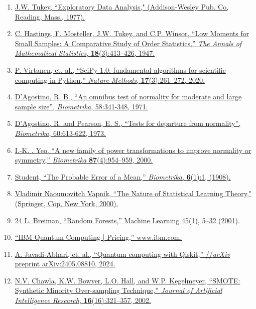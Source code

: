 \documentclass[11pt, oneside]{article}   	%
\begin{document}
\begin{enumerate}
   \item \href{https://books.google.com/books/about/Exploratory_Data_Analysis.html?id=UT9dAAAAIAAJ}{J.W. Tukey, ``Exploratory Data Analysis," (Addison-Wesley Pub. Co, Reading, Mass., 1977).}
   
   \item \href{https://doi.org/10.1214/aoms/1177730388}{C. Hastings, F. Mosteller, J.W. Tukey, and C.P. Winsor, ``Low Moments for Small Samples: A Comparative Study of Order Statistics,” \textit{The Annals of Mathematical Statistics}, \textbf{18}(3):413–426, 1947.}
   
   \item \href{https://www.nature.com/articles/s41592-019-0686-2}{P. Virtanen, et. al., “SciPy 1.0: fundamental algorithms for scientific computing in Python,” \textit{Nature Methods}, \textbf{17}(3):261–272, 2020.}
   
   \item \href{https://doi.org/10.2307/2334522}{D’Agostino, R. B., ``An omnibus test of normality for moderate and large sample size”, \textit{Biometrika}, 58:341-348, 1971.}
   
   \item \href{https://doi.org/10.2307/2335012}{D’Agostino, R. and Pearson, E. S., ``Tests for departure from normality”, \textit{Biometrika}, 60:613-622, 1973.}
   
   \item \href{https://doi.org/10.1093/biomet/87.4.954}{I.-K. . Yeo, “A new family of power transformations to improve normality or symmetry,” \textit{Biometrika} \textbf{87}(4):954–959, 2000.}
   
   \item \href{https://doi.org/10.2307/2331554}{Student, “The Probable Error of a Mean,” \textit{Biometrika}, \textbf{6}(1):1, (1908).}
   
   \item \href{https://link.springer.com/book/10.1007/978-1-4757-3264-1}{Vladimir Naoumovitch Vapnik, ``The Nature of Statistical Learning Theory," (Springer, Cop, New York, 2000).}
   
   \item \href{https://doi.org/10.1023/A:1010933404324}{24 L. Breiman, ``Random Forests,” Machine Learning 45(1), 5–32 (2001).}
   
   \item \href{https://www.ibm.com/quantum/pricing}{``IBM Quantum Computing | Pricing,” www.ibm.com.}
   
   \item \href{https://doi.org/10.48550/arXiv.2405.08810}{A. Javadi-Abhari, et. al., ``Quantum computing with Qiskit,” //\textit{arXiv} preprint arXiv:2405.08810, 2024.}
   
   \item \href{https://doi.org/10.1613/jair.953}{N.V. Chawla, K.W. Bowyer, L.O. Hall, and W.P. Kegelmeyer, ``SMOTE: Synthetic Minority Over-sampling Technique,” \textit{Journal of Artificial Intelligence Research}, \textbf{16}(16):321–357, 2002.}
\end{enumerate}
\end{document}
